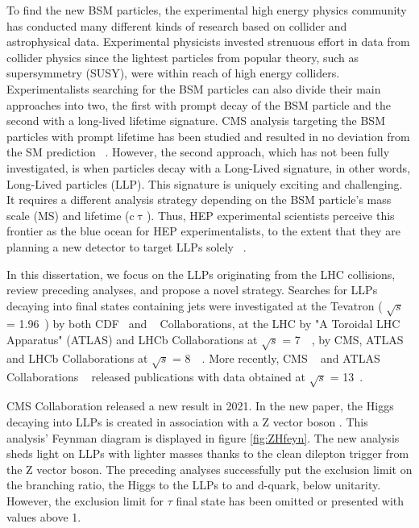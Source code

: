 To find the new BSM particles, the experimental high energy physics community has conducted many different kinds of research based on collider and astrophysical data.
Experimental physicists invested strenuous effort in data from collider physics since the lightest particles from popular theory, such as supersymmetry (SUSY), were within reach of high energy colliders.
Experimentalists searching for the BSM particles can also divide their main approaches into two, the first with prompt decay of the BSM particle and the second with a long-lived lifetime signature.
CMS analysis targeting the BSM particles with prompt lifetime has been studied and resulted in no deviation from the SM prediction ~\cite{SUSY}.
However, the second approach, which has not been fully investigated, is when particles decay with a Long-Lived signature, in other words, Long-Lived particles (LLP).
This signature is uniquely exciting and challenging.
It requires a different analysis strategy depending on the BSM particle's mass scale (MS) and lifetime (c$\uptau$).
Thus, HEP experimental scientists perceive this frontier as the blue ocean for HEP experimentalists, to the extent that they are planning a new detector to target LLPs solely ~\cite{Barron:2022aac}.

In this dissertation, we focus on the LLPs originating from the LHC collisions, review preceding analyses, and propose a novel strategy.
Searches for LLPs decaying into final states containing jets were investigated
at the Tevatron ( $\sqrt{s}$ = 1.96~\TeV) by both CDF~\cite{Aaltonen:2011rja} and \DZERO~\cite{Abazov:2009ik} Collaborations,
at the LHC by "A Toroidal LHC Apparatus" (ATLAS) and LHCb Collaborations at $\sqrt{s}$ = 7~\TeV~\cite{ATLAS:2012av,Aaij:2014nma},
by CMS, ATLAS and LHCb Collaborations at $\sqrt{s}$ = 8~\TeV~\cite{Aad:2015uaa,Aad:2015rba,PhysRevD.91.012007,Aad:2015asa,Aaij:2017mic,Aaij:2016xmb,Aaij:2015ica}.
More recently, CMS ~\cite{Sirunyan:2017jdo,displacedvertices,displacedjets2016,delayedjets,emergingjets,CMS-PAS-EXO-19-021}
 and ATLAS Collaborations ~\cite{Aaboud:2018iil,Aaboud:2018jbr,Aaboud:2018arf,Aaboud:2018aqj,Aaboud:2018kbe,Aaboud:2019trc,Aaboud:2019opc,Aad:2019kiz,Aad:2019pfm,Aad:2019tcc,Aad:2019xav,Aad:2019tua} released publications with data obtained at $\sqrt{s}$ = 13~\TeV.

CMS Collaboration released a new result in 2021.
In the new paper, the Higgs decaying into LLPs is created in association with a Z vector boson \cite{ZHAN}.
This analysis' Feynman diagram is displayed in figure \ref{fig:ZHfeyn}.
The new analysis sheds light on LLPs with lighter masses thanks to the clean dilepton trigger from the Z vector boson.
The preceding analyses successfully put the exclusion limit on the branching ratio, the Higgs to the LLPs to \PQb and d-quark, below unitarity. 
However, the exclusion limit for $\tau$ final state has been omitted or presented with values above 1.

